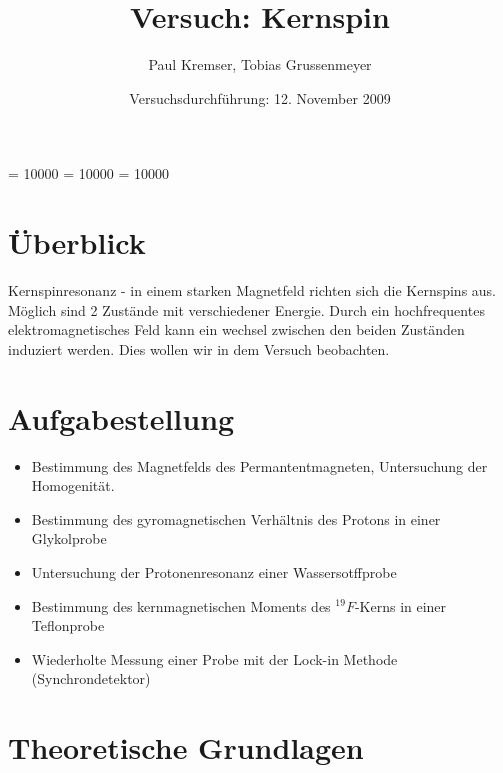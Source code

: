 \documentclass[12pt]{article}
\newcommand{\changefont}[3]{
\fontfamily{#1} \fontseries{#2} \fontshape{#3} \selectfont}
\begin{document}
\clubpenalty = 10000
\widowpenalty = 10000 
\displaywidowpenalty = 10000

\onehalfspacing
\changefont{ptm}{m}{n} 

\begin{titlepage}
\author{Paul Kremser, Tobias Grussenmeyer}
\title{Versuch: Kernspin}
\date{Versuchsdurchführung: 12. November 2009} 
\maketitle
\thispagestyle{empty}
\end{titlepage}


\tableofcontents
\thispagestyle{empty}
\newpage
{}
\section{Überblick}
Kernspinresonanz - in einem starken Magnetfeld richten sich die Kernspins aus. Möglich sind 2 Zustände mit verschiedener Energie. Durch ein hochfrequentes elektromagnetisches Feld kann ein wechsel zwischen den beiden Zuständen induziert werden. Dies wollen wir in dem Versuch beobachten.

\section{Aufgabestellung}
\begin{itemize}
 \item Bestimmung des Magnetfelds des Permantentmagneten, Untersuchung der Homogenität.
 \item Bestimmung des gyromagnetischen Verhältnis des Protons in einer Glykolprobe
 \item Untersuchung der Protonenresonanz einer Wassersotffprobe
 \item Bestimmung des kernmagnetischen Moments des $^{19}F$-Kerns in einer Teflonprobe
 \item Wiederholte Messung einer Probe mit der Lock-in Methode (Synchrondetektor)
\end{itemize}


\section{Theoretische Grundlagen}
\end{document}
